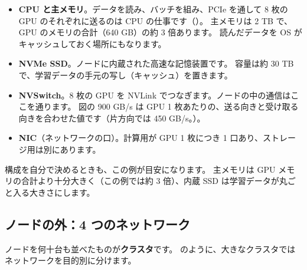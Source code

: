 \begin{itemize}
\item \textbf{CPU と主メモリ}。データを読み、バッチを組み、PCIe を通して 8 枚の GPU のそれぞれに送るのは CPU の仕事です（）。
主メモリは 2 TB で、GPU のメモリの合計（640 GB）の約 3 倍あります。
読んだデータを OS がキャッシュしておく場所にもなります。
\item \textbf{NVMe SSD}。ノードに内蔵された高速な記憶装置です。
容量は約 30 TB で、学習データの手元の写し（キャッシュ）を置きます。
\item \textbf{NVSwitch}。8 枚の GPU を NVLink でつなぎます。ノードの中の通信はここを通ります。
図の 900 GB/s は GPU 1 枚あたりの、送る向きと受け取る向きを合わせた値です（片方向では 450 GB/s。）。
\item \textbf{NIC}（ネットワークの口）。計算用が GPU 1 枚につき 1 口あり、ストレージ用は別にあります。
\end{itemize}
構成を自分で決めるときも、この例が目安になります。
主メモリは GPU メモリの合計より十分大きく（この例では約 3 倍）、内蔵 SSD は学習データが丸ごと入る大きさにします。

\subsection*{ノードの外：4 つのネットワーク}

ノードを何十台も並べたものが\textbf{クラスタ}です。
のように、大きなクラスタではネットワークを目的別に分けます。

